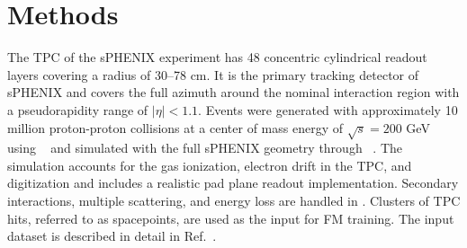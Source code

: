 \documentclass[aps,physrev,twocolumn,superscriptaddress]{revtex4-2}
\begin{document}



\section{Methods}



The TPC of the sPHENIX experiment has 48 concentric cylindrical readout layers covering a radius of 30--78 cm. It is the primary tracking detector of sPHENIX and covers the full azimuth around the nominal interaction region with a pseudorapidity range of $|\eta|<1.1$. Events were generated with approximately 10 million proton-proton collisions at a center of mass energy of $\sqrt{s}=200$ GeV using \pythia~\cite{Bierlich:2022pfr} and simulated with the full sPHENIX geometry through \geant~\cite{AGOSTINELLI2003250}. 
The simulation accounts for the gas ionization, electron drift in the TPC, and digitization and includes a realistic pad plane readout implementation. Secondary interactions, multiple scattering, and energy loss are handled in \geant. Clusters of TPC hits, referred to as spacepoints, are used as the input for FM training. The input dataset is described in detail in Ref.~\cite{LI2026112393}.
\end{document}

